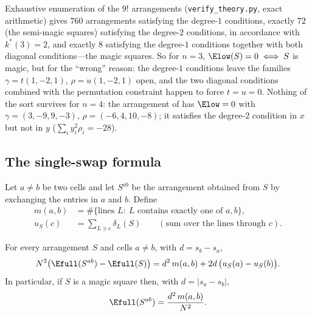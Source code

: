\begin{remark}[Why the low-mode energy appeared to work for $n=3$]
\label{rem:n3_lowmode}
Exhaustive enumeration of the $9!$ arrangements (\texttt{verify\_theory.py}, exact arithmetic) gives $760$ arrangements
satisfying the degree-$1$ conditions, exactly $72$ (the semi-magic squares) satisfying the degree-$2$ conditions, in accordance
with $k^{*}(3)=2$, and exactly $8$ satisfying the degree-$1$ conditions together with both diagonal conditions---the magic
squares.  So for $n=3$, $\Elow(S)=0\iff S$ is magic, but for the ``wrong'' reason: the degree-$1$ conditions leave the
families $\gamma=t(1,-2,1)$, $\rho=u(1,-2,1)$ open, and the two diagonal conditions combined with the permutation constraint
happen to force $t=u=0$.  Nothing of the sort survives for $n=4$: the arrangement of  has
$\Elow=0$ with $\gamma=(3,-9,9,-3)$, $\rho=(-6,4,10,-8)$; it satisfies the degree-$2$ condition in $x$ but not in $y$
($\sum_iy_i^{2}\rho_i=-28$).
\end{remark}

\subsection{The single-swap formula}
\label{sec:theory_swap}

Let $a\ne b$ be two cells and let $S^{ab}$ be the arrangement obtained from $S$ by exchanging the entries in
$a$ and $b$.  Define
\begin{align*}
m(a,b)&=\#\{\text{lines }L:\ L\text{ contains exactly one of }a,b\},\\
u_S(c)&=\sum_{L\ni c}\delta_L(S)\qquad(\text{sum over the lines through }c).
\end{align*}

\begin{theorem}
\label{thm:swap}
For every arrangement $S$ and cells $a\ne b$, with $d=s_b-s_a$,
\begin{equation}
N^{2}\bigl(\Efull(S^{ab})-\Efull(S)\bigr)=d^{2}\,m(a,b)+2d\,\bigl(u_S(a)-u_S(b)\bigr).
\label{eq:swap_general}
\end{equation}
In particular, if $S$ is a magic square then, with $d=|s_a-s_b|$,
\begin{equation}
\Efull(S^{ab})=\frac{d^{2}\,m(a,b)}{N^{2}} .
\label{eq:swap_magic}
\end{equation}
\end{theorem}

